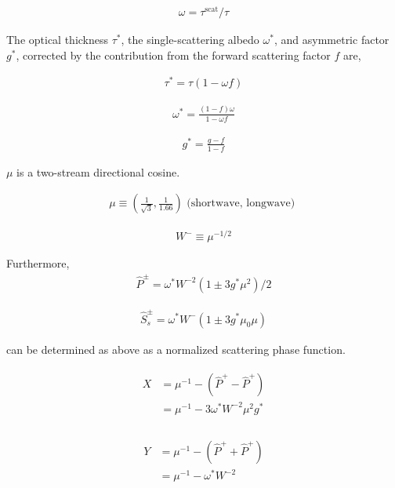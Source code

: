 \begin{eqnarray}
\omega=\tau^{\text{scat}}/\tau
\end{eqnarray}

The optical thickness \(\tau^{*}\), the single-scattering albedo
\(\omega^{*}\), and asymmetric factor \(g^{*}\), corrected by the
contribution from the forward scattering factor \(f\) are,

\begin{eqnarray}
\tau^{*}=\tau(1-\omega f)
\end{eqnarray}

\begin{eqnarray}
\omega^{*}=\frac{(1-f) \omega}{1-\omega f}
\end{eqnarray}

\begin{eqnarray}
g^{*}=\frac{g-f}{1-f}
\end{eqnarray}

\(\mu\) is a two-stream directional cosine.

\begin{eqnarray}
\mu \equiv\left(\frac{1}{\sqrt{3}}, \frac{1}{1.66}\right) \text { (shortwave, longwave) }
\end{eqnarray}

\begin{eqnarray}
W^{-} \equiv \mu^{-1 / 2}
\end{eqnarray}

Furthermore, \begin{eqnarray}
\hat{P}^{\pm}=\omega^{*} W^{-2}\left(1 \pm 3 g^{*} \mu^{2}\right) / 2
\end{eqnarray}

\begin{eqnarray}
\hat{S}_{s}^{\pm}=\omega^{*} W^{-}\left(1 \pm 3 g^{*} \mu_{0} \mu\right)
\end{eqnarray}

can be determined as above as a normalized scattering phase function.

\begin{eqnarray}
\begin{aligned}
X &=\mu^{-1}-\left(\hat{P}^{+}-\hat{P}^{+}\right) \\
&=\mu^{-1}-3 \omega^{*} W^{-2} \mu^{2} g^{*} \\
\end{aligned}
\end{eqnarray}

\begin{eqnarray}
\begin{aligned}
Y &=\mu^{-1}-\left(\hat{P}^{+}+\hat{P}^{+}\right) \\
&=\mu^{-1}-\omega^{*} W^{-2} \\
\end{aligned}
\end{eqnarray}

